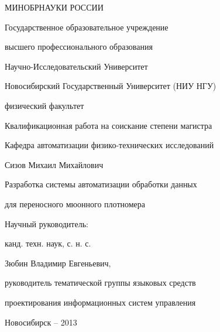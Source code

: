 \thispagestyle{empty}
\begin{large}


\begin{center}
МИНОБРНАУКИ РОССИИ\par
\vspace{10mm}
Государственное образовательное учреждение \par
высшего профессионального образования\par 
\end{center}



\begin{center}
Научно-Исследовательский Университет 

Новосибирский Государственный Университет (НИУ НГУ)\par
\end{center}



\vspace{10mm}
\begin{center}
физический факультет
\end{center}

\vspace{10mm}
\begin{center}
Квалификационная работа на соискание степени магистра

Кафедра автоматизации физико-технических исследований
\end{center}

\vspace{20mm}
\begin{center}
Сизов Михаил Михайлович


Разработка системы автоматизации обработки данных 


для переносного мюонного плотномера
\end{center}

\vspace{40mm}
%

\begin{flushleft}

Научный руководитель:

канд. техн. наук, с. н. с.

Зюбин Владимир Евгеньевич,

руководитель тематической группы языковых средств 

проектирования информационных систем управления

\end{flushleft}
\end{large}
\vspace{20mm}
\begin{center}
{Новосибирск -- 2013}
\end{center}

\newpage